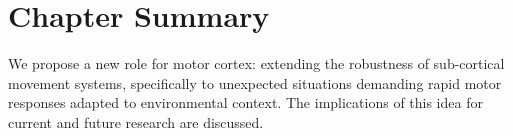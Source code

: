 				
\section{Chapter Summary}

We propose a new role for motor cortex: extending the robustness of sub-cortical movement systems, specifically to unexpected situations demanding rapid motor responses adapted to environmental context. The implications of this idea for current and future research are discussed.

\pagebreak


